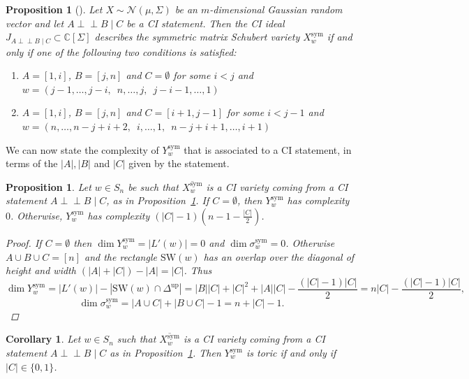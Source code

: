 \documentclass[11pt]{amsart}
\newtheorem{proposition}[theorem]{Proposition}
\newtheorem{corollary}[theorem]{Corollary}
\theoremstyle{definition}
\theoremstyle{definition}
\theoremstyle{definition}
\theoremstyle{definition}
\newcommand{\SW}{\mathrm{SW}}
\newcommand{\sym}{\mathrm{sym}}
\newcommand{\indep}{\perp \!\!\! \perp}
\begin{document}
\begin{proposition}[{\cite[Proposition 4.1]{fink2016matrix}}] \label{prop:one CI}
    Let $X \sim \mathcal N (\mu, \Sigma)$ be an $m$-dimensional Gaussian random vector and let $A \indep B \mid C$ be a CI statement. Then the CI ideal $J_{A \indep B \mid C} \subset \mathbb C [\Sigma]$ describes the symmetric matrix Schubert variety $X_w^{\sym}$ if and only if one of the following two conditions is satisfied:
    \begin{enumerate}
        \item $A= [1,i]$, $B= [j,n]$ and $C= \emptyset$ for some $i<j$ and \\
        $w= (j-1, \ldots, j-i, \,\,\, n, \ldots, j, \,\,\, j-i-1, \ldots, 1)$
        \item $A=[1,i]$, $B=[j,n]$ and $C=[i+1,j-1]$ for some $i<j-1$ and \\
        $w = (n, \ldots, n-j+i+2, \,\,\, i , \ldots, 1, \,\,\, n-j+i+1, \ldots, i+1)$
    \end{enumerate}
\end{proposition}
\noindent We can now state the complexity of $Y^{\sym}_w$ that is associated to a CI statement, in terms of the $|A|,|B|$ and $|C|$ given by the statement.
\begin{proposition}\label{prop: complexity Mschu}
    Let $w \in S_n$ be such that $\overline{X^{\sym}_w}$ is a CI variety coming from a CI statement $A \indep B \mid C$, as in Proposition~\ref{prop:one CI}. If $C= \emptyset$, then $Y^{\sym}_w$ has complexity $0$. Otherwise, $Y^{\sym}_w$ has complexity $(|C|-1)(n-1-\frac{|C|}{2}) $.
    \begin{proof}
    If $C = \emptyset$ then $\dim Y^{\sym}_w = |L'(w)| = 0$ and $\dim \sigma^{\sym}_w = 0$. Otherwise $A \cup B \cup C = [n]$ and the rectangle $\SW(w)$ has an overlap over the diagonal of height and width $(|A|+|C|)-|A|=|C|$. Thus
        $$\dim Y^{\sym}_w = |L'(w)| - |\SW(w) \cap \Delta^{\textrm{up}} |
                          = |B||C| + |C|^2 + |A||C| - \frac{(|C|-1)|C|}{2}
                          = n |C| -\frac{(|C|-1)|C|}{2},
                          $$        
        $$\dim \sigma^{\sym}_w = |A \cup C| + |B \cup C| -1 = n+ |C|-1. $$ \qedhere  \end{proof}
\end{proposition}

\begin{corollary}
    Let $w \in S_n$ such that $\overline{X^{\sym}_w}$ is a CI variety coming from a CI statement $A \indep B \mid C$ as in Proposition~\ref{prop:one CI}. Then $Y^{\sym}_w$ is toric if and only if $|C| \in \{0,1\}$.
    
\end{corollary}
\end{document}
